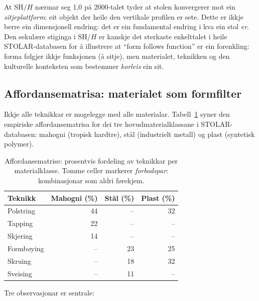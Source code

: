 \documentclass[10pt, a4paper, twocolumn]{article}
\begin{document}
At $\text{SH}/H$ nærmar seg 1,0 på 2000-talet tyder at stolen konvergerer mot ein \emph{sitjeplattform}: eit objekt der heile den vertikale profilen er sete. Dette er ikkje berre ein dimensjonell endring: det er ein fundamental endring i kva ein stol \emph{er}. Den sekulære stiginga i $\text{SH}/H$ er kanskje det sterkaste enkelttalet i heile STOLAR-databasen for å illustrere at ``form follows function'' er ein forenkling: forma følgjer ikkje funksjonen (å sitje), men materialet, teknikken og den kulturelle konteksten som bestemmer \emph{korleis} ein sit.


\subsection{Affordansematrisa: materialet som formfilter}

Ikkje alle teknikkar er mogelegge med alle materialar. Tabell~\ref{tab:affordanse} syner den empiriske affordansematrisa for dei tre hovudmaterialklassane i STOLAR-databasen: mahogni (tropisk hardtre), stål (industrielt metall) og plast (syntetisk polymer).

\begin{table}[H]
\centering
\caption{Affordansematrise: prosentvis fordeling av teknikkar per materialklasse. Tomme celler markerer \emph{forbodspar}: kombinasjonar som aldri førekjem.}
\label{tab:affordanse}
\begin{tabular}{@{}lrrr@{}}
\toprule
\textbf{Teknikk} & \textbf{Mahogni (\%)} & \textbf{Stål (\%)} & \textbf{Plast (\%)} \\
\midrule
Polstring & 44 & -- & 32 \\
Tapping & 22 & -- & -- \\
Skjering & 14 & -- & -- \\
Formbøying & -- & 23 & 25 \\
Skruing & -- & 18 & 32 \\
Sveising & -- & 11 & -- \\
\bottomrule
\end{tabular}
\end{table}

Tre observasjonar er sentrale:
\end{document}

